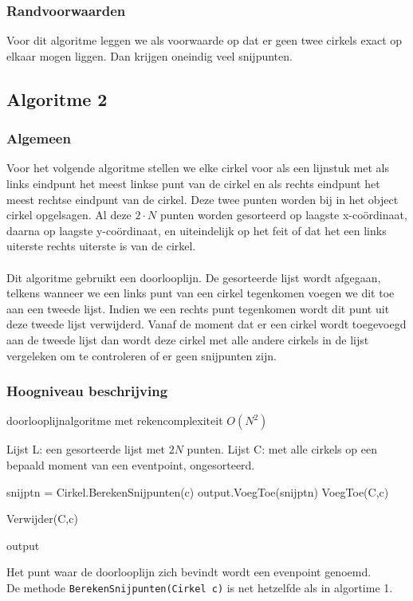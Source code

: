 \documentclass[11pt,a4paper]{article}
\begin{document}
\subsubsection{Randvoorwaarden}
Voor dit algoritme leggen we als voorwaarde op dat er geen twee cirkels exact op elkaar mogen liggen. Dan krijgen oneindig veel snijpunten.

\subsection{Algoritme 2}
\subsubsection{Algemeen}
Voor het volgende algoritme stellen we elke cirkel voor als een lijnstuk met als links eindpunt het meest linkse punt van de cirkel en als rechts eindpunt het meest rechtse eindpunt van de cirkel. Deze twee punten worden bij in het object cirkel opgelsagen. Al deze $2\cdot N$ punten worden gesorteerd op laagste x-coördinaat, daarna op laagste y-coördinaat, en uiteindelijk op het feit of dat het een links uiterste rechts uiterste is van de cirkel.
\\
\\
Dit algoritme gebruikt een doorlooplijn. De gesorteerde lijst wordt afgegaan, telkens wanneer we een links punt van een cirkel tegenkomen voegen we dit toe aan een tweede lijst. Indien we een rechts punt tegenkomen wordt dit punt uit deze tweede lijst verwijderd. Vanaf de moment dat er een cirkel wordt toegevoegd aan de tweede lijst dan wordt deze cirkel met alle andere cirkels in de lijst vergeleken om te controleren of er geen snijpunten zijn.
\subsubsection{Hoogniveau beschrijving}
\begin{algorithm}[H]
\caption{doorlooplijnalgoritme met rekencomplexiteit $O(N^2)$}
\begin{algorithmic}
\State Lijst L: een gesorteerde lijst met $2N$ punten.
\State Lijst C: met alle cirkels op een bepaald moment van een eventpoint, ongesorteerd.



\State snijptn = Cirkel.BerekenSnijpunten(c)
\State output.VoegToe(snijptn)
\State VoegToe(C,c)

\Else
\State Verwijder(C,c)
\EndIf
\EndFor

\Return output
\end{algorithmic}
\end{algorithm}
Het punt waar de doorlooplijn zich bevindt wordt een evenpoint genoemd.\\
De methode \verb|BerekenSnijpunten(Cirkel c)| is net hetzelfde als in algortime 1.
\end{document}
